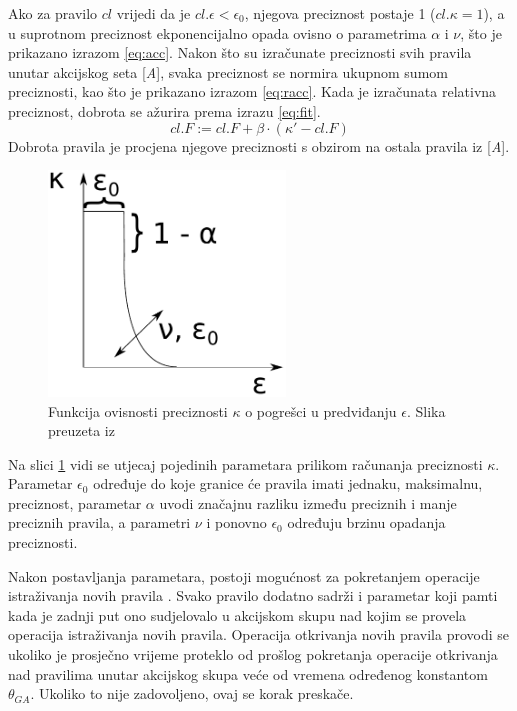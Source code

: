 \documentclass[times, utf8, zavrsni]{fer}
\begin{document}
Ako za pravilo $cl$ vrijedi da je $cl.\epsilon < \epsilon_{0}$, njegova preciznost postaje 1 ($cl.\kappa = 1$), a u suprotnom preciznost ekponencijalno opada ovisno o parametrima $\alpha$ i $\nu$, što je prikazano izrazom \eqref{eq:acc}.
Nakon što su izračunate preciznosti svih pravila unutar akcijskog seta [\emph{A}], svaka preciznost se normira ukupnom sumom preciznosti, kao što je prikazano izrazom \eqref{eq:racc}.
Kada je izračunata relativna preciznost, dobrota se ažurira prema izrazu \eqref{eq:fit}.
\begin{equation}
    \label{eq:fit}
    cl.F := cl.F + \beta \cdot (\kappa' - cl.F)
\end{equation}
Dobrota pravila je procjena njegove preciznosti s obzirom na ostala pravila iz [\emph{A}].
\begin{figure}[h]
    \centering
    \includegraphics[height=6cm]{img/fit.pdf}
    \caption{Funkcija ovisnosti preciznosti $\kappa$ o pogrešci u predviđanju $\epsilon$. Slika preuzeta iz \citep{5}}
    \label{img:fit}
\end{figure}
Na slici \ref{img:fit} vidi se utjecaj pojedinih parametara prilikom računanja preciznosti $\kappa$.
Parametar $\epsilon_{0}$ određuje do koje granice će pravila imati jednaku, maksimalnu, preciznost, parametar $\alpha$ uvodi značajnu razliku između preciznih i manje preciznih pravila, a parametri $\nu$ i ponovno $\epsilon_{0}$ određuju brzinu opadanja preciznosti.

Nakon postavljanja parametara, postoji mogućnost za pokretanjem operacije istraživanja novih pravila .
Svako pravilo dodatno sadrži i parametar koji pamti kada je zadnji put ono sudjelovalo u akcijskom skupu nad kojim se provela operacija istraživanja novih pravila.
Operacija otkrivanja novih pravila provodi se ukoliko je prosječno vrijeme proteklo od prošlog pokretanja operacije otkrivanja nad pravilima unutar akcijskog skupa veće od vremena određenog konstantom $\theta_{GA}$.
Ukoliko to nije zadovoljeno, ovaj se korak preskače.
\end{document}
